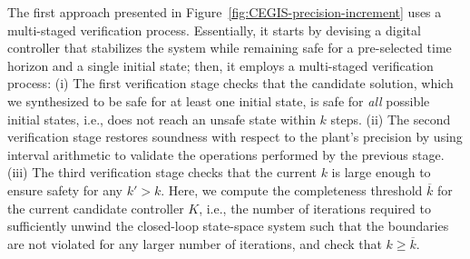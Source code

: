 \documentclass[10pt,conference]{IEEEtran}
\begin{document}
The first approach presented in Figure~\ref{fig:CEGIS-precision-increment}
uses a multi-staged verification process. 
Essentially, it starts by devising a
digital controller that stabilizes the system while remaining safe for a
pre-selected time horizon and a single initial state; then, it
employs a multi-staged verification process:
(i) The first verification stage checks that the candidate
solution, which we synthesized to be safe for at least one initial
state, is safe for \emph{all} possible initial states, i.e., does not reach
an unsafe state within $k$ steps.
(ii) The second verification stage 
 restores soundness with respect to the plant's precision
by using interval arithmetic \cite{moore1966interval} to validate the 
operations performed by the previous stage. 
(iii) The third verification stage checks that the current
$k$ is large enough to ensure safety for any $k'{>}k$.  Here, we compute the
completeness threshold $\overline{k}$ for the current candidate controller $K$,
i.e., the number of
iterations required to sufficiently unwind the closed-loop state-space
system such that the boundaries are not violated for any larger number of
iterations, and
check that $k{\geq}\overline{k}$.
\end{document}
